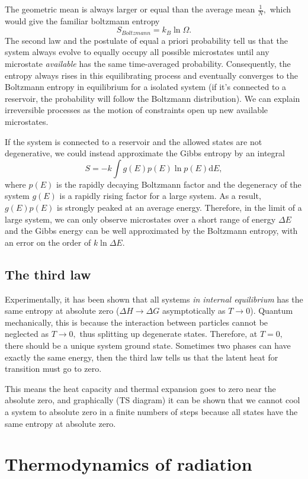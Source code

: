 \documentclass{article}
\theoremstyle{nonumberplain}
\begin{document}
The geometric mean is always larger or equal than the average mean $\frac{1}{N},$ which would give the familiar boltzmann entropy
\[
    \boxed{S_{Boltzmann} = k_B \ln \Omega.}
\]
The second law and the postulate of equal a priori probability tell us that the system always evolve to equally occupy all possible microstates until any microstate \textit{available} has the same time-averaged probability. Consequently, the entropy always rises in this equilibrating process and eventually converges to the Boltzmann entropy in equilibrium for a isolated system (if it's connected to a reservoir, the probability will follow the Boltzmann distribution). We can explain irreversible processes as the motion of constraints open up new available microstates.

If the system is connected to a reservoir and the allowed states are not degenerative, we could instead approximate the Gibbs entropy by an integral
\[
    S = - k \int g(E) p(E) \ln{p(E)} \mathrm{d} E,
\]
where $p(E)$ is the rapidly decaying Boltzmann factor and the degeneracy of the system $g(E)$ is a rapidly rising factor for a large system. As a result, $g(E) p(E)$ is strongly peaked at an average energy. Therefore, in the limit of a large system, we can only observe microstates over a short range of energy $\Delta E$ and the Gibbs energy can be well approximated by the Boltzmann entropy, with an error on the order of $k\ln{\Delta E}.$

\subsection{The third law}
Experimentally, it has been shown that all systems \textit{in internal equilibrium} has the same entropy at absolute zero ($\Delta H \to \Delta G$ asymptotically as $T \to 0$). Quantum mechanically, this is because the interaction between particles cannot be neglected as $T\to 0,$ thus splitting up degenerate states. Therefore, at $T=0,$ there should be a unique system ground state. Sometimes two phases can have exactly the same energy, then the third law tells us that the latent heat for transition must go to zero. 

This means the heat capacity and thermal expansion goes to zero near the absolute zero, and graphically (TS diagram) it can be shown that we cannot cool a system to absolute zero in a finite numbers of steps because all states have the same entropy at absolute zero. 

\section{Thermodynamics of radiation}
\end{document}

